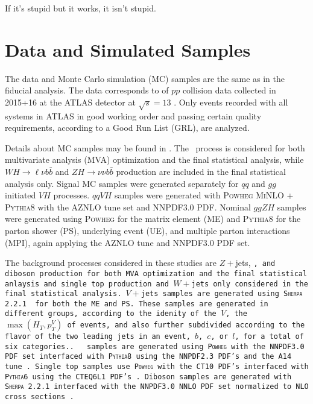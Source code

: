 \begin{savequote}[75mm]
If it's stupid but it works, it isn't stupid.
\end{savequote}

\chapter{Data and Simulated Samples}


The data and Monte Carlo simulation (MC) samples are the same as in the fiducial analysis.  The data corresponds to \LUMI of $pp$ collision data collected in 2015+16 at the ATLAS detector at $\sqrt{s}=13$ \TeV.  Only events recorded with all systems in ATLAS in good working order and passing certain quality requirements, according to a Good Run List (GRL), are analyzed.

Details about MC samples may be found in \cite{modelingnote}.  The \ZH\, process is considered for both multivariate analysis (MVA) optimization and the final statistical analysis, while $WH\to\ell\nu b\bar{b}$ and $ZH\to\nu\nu b\bar{b}$ production are included in the final statistical analysis only.  Signal MC samples were generated separately for $qq$ and $gg$ initiated $VH$ processes.  $qqVH$ samples were generated with \textsc{Powheg MiNLO + Pythia8} with the AZNLO tune set and NNPDF3.0 PDF.  %
  Nominal $ggZH$ samples were generated using \textsc{Powheg} for the matrix element (ME) and \textsc{Pythia8} for the parton shower (PS), underlying event (UE), and multiple parton interactions (MPI), again applying the AZNLO tune and NNPDF3.0 PDF set. \cite{support17}

The background processes considered in these studies are $Z+$jets, \tt, and diboson production for both MVA optimization and the final statistical anlaysis and single top production and $W+$jets only considered in the final statistical analysis.  $V+$jets samples are generated using \textsc{Sherpa 2.2.1} \cite{support18} for both the ME and PS.  These samples are generated in different groups, according to the idenity of the $V$, the $\max\left(H_T,p_T^V\right)$ of events, and also further subdivided according to the flavor of the two leading jets in an event, $b$, $c$, or $l$, for a total of six categories..  \tt\, samples are generated using \textsc{Powheg} with the NNPDF3.0 PDF set interfaced with \textsc{Pythia8} using the NNPDF2.3 PDF's and the A14 tune \cite{support19}.  Single top samples use \textsc{Powheg} with the CT10 PDF's interfaced with \textsc{Pythia6} using the CTEQ6L1 PDF's \cite{support20,support21}.  Diboson samples are generated with \textsc{Sherpa 2.2.1} interfaced with the NNPDF3.0 NNLO PDF set normalized to NLO cross sections \cite{support22}.

